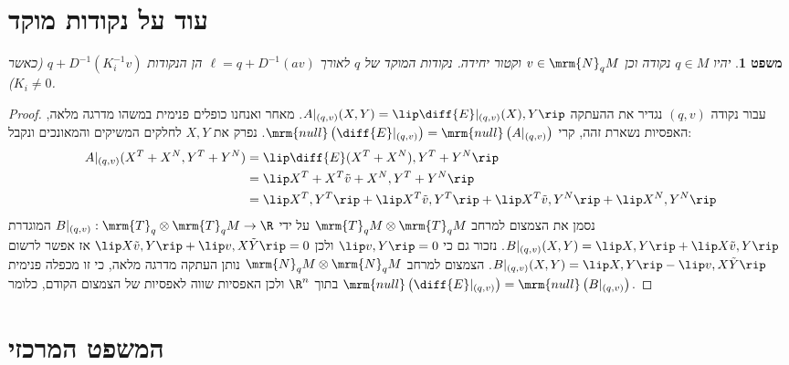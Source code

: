 \documentclass{article}
\newtheorem{theorem}{משפט}
\theoremstyle{definition}
\begin{document}
	\section{עוד על נקודות מוקד}
	
	\begin{theorem}\label{focal-curvature}
		יהיו
		\(q\in M\)
		נקודה וכן
		\(v\in\mrm{N}_q M\)
		וקטור יחידה.
		נקודות המוקד של \(q\) לאורך
		\(\ell = q+D^{-1}(av)\)
		הן הנקודות
		\(q + D^{-1}(K_i^{-1} v)\)
		(כאשר \(K_i\neq 0\)).
	\end{theorem}

	\begin{proof}
		עבור נקודה
		\((q,v)\)
		נגדיר את ההעתקה
		\(A|_{(q,v)}(X,Y)=\lip \diff{E}|_{(q,v)}(X),Y \rip\).
		מאחר ואנחנו כופלים פנימית במשהו מדרגה מלאה, האפסיות נשארת זהה, קרי
		\(
			\mrm{null}\left(\diff{E}|_{(q,v)}\right)
			=\mrm{null}\left(A|_{(q,v)}\right)
		\).
		נפרק את \(X,Y\) לחלקים המשיקים והמאונכים ונקבל:
		\begin{equation*}\begin{split}
			A|_{(q,v)}(X^T+X^N,Y^T+Y^N)
			&= \lip \diff{E}(X^T+X^N),Y^T+Y^N \rip
			\\&= \lip X^T+X^T\tilde{v} +X^N ,Y^T+Y^N \rip
			\\&= \lip X^T,Y^T \rip + \lip X^T\tilde{v},Y^T \rip
			+ \lip X^T\tilde{v},Y^N \rip + \lip X^N,Y^N \rip
		\end{split}\end{equation*}
		נסמן את הצמצום למרחב
		\(\mrm{T}_q M \otimes \mrm{T}_q M\)
		על ידי
		\(B|_{(q,v)}: \mrm{T}_q \otimes \mrm{T}_q M \to \R\)
		המוגדרת
		\(B|_{(q,v)}(X,Y) = \lip X,Y \rip + \lip X\tilde{v},Y \rip\).
		נזכור גם כי
		\(\lip v,Y \rip=0\)
		ולכן
		\(
			\lip X\tilde{v},Y \rip + \lip v,X\tilde{Y} \rip=0
		\)
		אז אפשר לרשום
		\(B|_{(q,v)}(X,Y) = \lip X,Y \rip - \lip v,X\tilde{Y} \rip\).
		הצמצום למרחב
		\(\mrm{N}_q M \otimes \mrm{N}_q M\)
		נותן העתקה מדרגה מלאה, כי זו מכפלה פנימית בתוך
		\(\R^n\)
		ולכן האפסיות שווה לאפסיות של הצמצום הקודם, כלומר
		\(
			\mrm{null}\left(\diff{E}|_{(q,v)}\right)
			=\mrm{null}\left(B|_{(q,v)}\right)
		\).
	\end{proof}




	\section{המשפט המרכזי}
	
\end{document}

